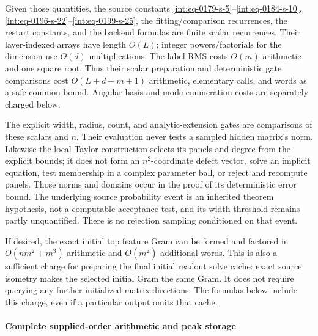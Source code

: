 
Given those quantities, the source constants \eqref{int:eq-0179-s-5}--\allowbreak \eqref{int:eq-0184-s-10}, \eqref{int:eq-0196-s-22}--\allowbreak \eqref{int:eq-0199-s-25}, the fitting/comparison recurrences, the restart constants, and the backend formulas are finite scalar recurrences. Their layer-indexed arrays have length \(O(L)\); integer powers/factorials for the dimension use \(O(d)\) multiplications. The label RMS costs \(O(m)\) arithmetic and one square root. Thus their scalar preparation and deterministic gate comparisons cost \(O(L+d+m+1)\) arithmetic, elementary calls, and words as a safe common bound. Angular basis and mode enumeration costs are separately charged below.



The explicit width, radius, count, and analytic-extension gates are comparisons of these scalars and \(n\). Their evaluation never tests a sampled hidden matrix's norm. Likewise the local Taylor construction selects its panels and degree from the explicit bounds; it does not form an \(n^2\)-coordinate defect vector, solve an implicit equation, test membership in a complex parameter ball, or reject and recompute panels. Those norms and domains occur in the proof of its deterministic error bound. The underlying source probability event is an inherited theorem hypothesis, not a computable acceptance test, and its width threshold remains partly unquantified. There is no rejection sampling conditioned on that event.



If desired, the exact initial top feature Gram can be formed and factored in \(O(nm^2+m^3)\) arithmetic and \(O(m^2)\) additional words. This is also a sufficient charge for preparing the final initial readout solve cache: exact source isometry makes the selected initial Gram the same Gram. It does not require querying any further initialized-matrix directions. The formulas below include this charge, even if a particular output omits that cache.


\paragraph{Complete supplied-order arithmetic and peak storage}
\label{int:setup-implicit-5}
\mbox{}\par\smallskip


